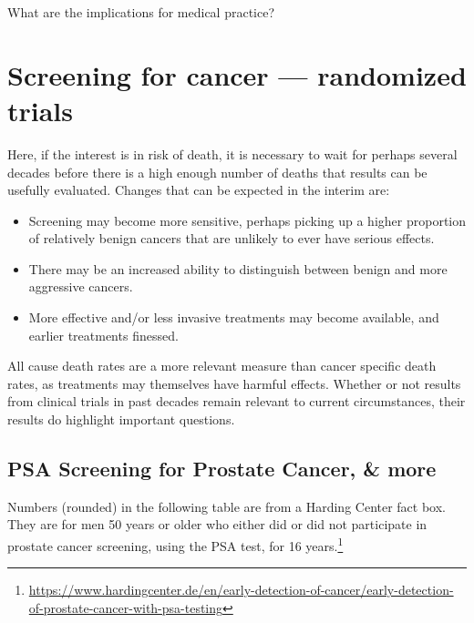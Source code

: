 \documentclass[
  10pt,
  b5paper]{book}
\providecommand{\tightlist}{%
  \setlength{\itemsep}{0pt}\setlength{\parskip}{0pt}}
\begin{document}
What are the implications for medical practice?

\hypertarget{screening-for-cancer-randomized-trials}{%
\section{Screening for cancer --- randomized trials}\label{screening-for-cancer-randomized-trials}}

Here, if the interest is in risk of death, it is necessary to wait
for perhaps several decades before there is a high enough number
of deaths that results can be usefully evaluated. Changes that
can be expected in the interim are:

\begin{itemize}
\tightlist
\item
  Screening may become more sensitive, perhaps picking up a higher
  proportion of relatively benign cancers that are unlikely to ever
  have serious effects.\\
\item
  There may be an increased ability to distinguish between benign
  and more aggressive cancers.\\
\item
  More effective and/or less invasive treatments may become available,
  and earlier treatments finessed.
\end{itemize}

All cause death rates are a more relevant measure than cancer specific
death rates, as treatments may themselves have harmful effects.
Whether or not results from clinical trials in past decades remain
relevant to current circumstances, their results do highlight
important questions.

\hypertarget{psa-screening-for-prostate-cancer-more}{%
\subsection*{PSA Screening for Prostate Cancer, \& more}\label{psa-screening-for-prostate-cancer-more}}

Numbers (rounded) in the following table are from a Harding Center fact
box. They are for men 50 years or older who either did or did not
participate in prostate cancer screening, using the PSA test, for 16
years.\footnote{\url{https://www.hardingcenter.de/en/early-detection-of-cancer/early-detection-of-prostate-cancer-with-psa-testing}}
\end{document}
